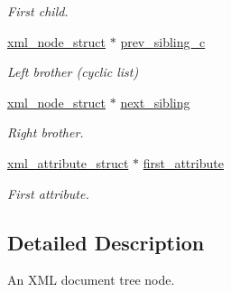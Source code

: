 \begin{DoxyCompactItemize}
\begin{DoxyCompactList}\small\item\em First child. \end{DoxyCompactList}\item 
\hypertarget{structpugi_1_1xml__node__struct_a74e62128c88c422c0ed969633bbb2d4e}{\hyperlink{structpugi_1_1xml__node__struct}{xml\-\_\-node\-\_\-struct} $\ast$ \hyperlink{structpugi_1_1xml__node__struct_a74e62128c88c422c0ed969633bbb2d4e}{prev\-\_\-sibling\-\_\-c}}\label{structpugi_1_1xml__node__struct_a74e62128c88c422c0ed969633bbb2d4e}

\begin{DoxyCompactList}\small\item\em Left brother (cyclic list) \end{DoxyCompactList}\item 
\hypertarget{structpugi_1_1xml__node__struct_acf0867e3a77871e37132046d97398a6d}{\hyperlink{structpugi_1_1xml__node__struct}{xml\-\_\-node\-\_\-struct} $\ast$ \hyperlink{structpugi_1_1xml__node__struct_acf0867e3a77871e37132046d97398a6d}{next\-\_\-sibling}}\label{structpugi_1_1xml__node__struct_acf0867e3a77871e37132046d97398a6d}

\begin{DoxyCompactList}\small\item\em Right brother. \end{DoxyCompactList}\item 
\hypertarget{structpugi_1_1xml__node__struct_a482d2daf97ce0745661cb2c57d8f6fb3}{\hyperlink{structpugi_1_1xml__attribute__struct}{xml\-\_\-attribute\-\_\-struct} $\ast$ \hyperlink{structpugi_1_1xml__node__struct_a482d2daf97ce0745661cb2c57d8f6fb3}{first\-\_\-attribute}}\label{structpugi_1_1xml__node__struct_a482d2daf97ce0745661cb2c57d8f6fb3}

\begin{DoxyCompactList}\small\item\em First attribute. \end{DoxyCompactList}\end{DoxyCompactItemize}


\subsection{Detailed Description}
An X\-M\-L document tree node. 

